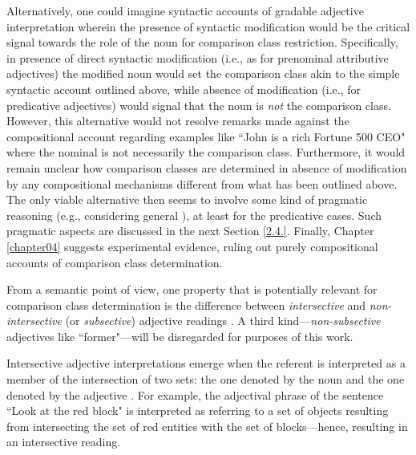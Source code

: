 Alternatively, one could imagine syntactic accounts of gradable adjective interpretation wherein the presence of syntactic modification would be the critical signal towards the role of the noun for comparison class restriction. Specifically, in presence of direct syntactic modification (i.e., as for prenominal attributive adjectives) the modified noun would set the comparison class akin to the simple syntactic account outlined above,  while absence of modification (i.e., for predicative adjectives) would signal that the noun is \emph{not} the comparison class. However, this alternative would not resolve remarks made against the compositional account regarding examples like ``John is a rich Fortune 500 CEO" where the nominal is not necessarily the comparison class. Furthermore, it would remain unclear how comparison classes are determined in absence of modification by any compositional mechanisms different from what has been outlined above. The only viable alternative then seems to involve some kind of pragmatic reasoning (e.g., considering general \textcite[world knowledge][]{tessler2017warm}), at least for the predicative cases. Such pragmatic aspects are discussed in the next Section \ref{2.4.}. Finally, Chapter \ref{chapter04} suggests experimental evidence, ruling out purely compositional accounts of comparison class determination. 

From a semantic point of view, one property that is potentially relevant for comparison class determination is the difference between \textit{intersective} and \textit{non-intersective} (or \textit{subsective}) adjective readings \parencite{sedivy1999, kennedy2012, hofherr2010adjectives}. A third kind---\textit{non-subsective} adjectives like ``former"---will be disregarded for purposes of this work. 

Intersective adjective interpretations emerge when the referent is interpreted as a member of the intersection of two sets: the one denoted by the noun and the one denoted by the adjective \parencite{kennedy2012}. For example, the adjectival phrase of the sentence ``Look at the red block" is interpreted as referring to a set of objects resulting from intersecting the set of red entities with the set of blocks---hence, resulting in an intersective reading.

